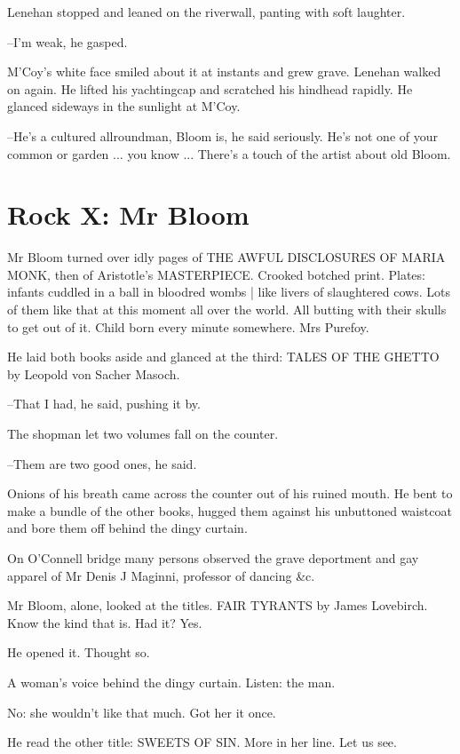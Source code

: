 Lenehan stopped and leaned on the riverwall,
panting with soft
laughter.

--I'm weak,
he gasped.

M'Coy's white face smiled about it at instants
and grew grave.
Lenehan walked on again.
He lifted his yachtingcap and scratched his
hindhead rapidly.
He glanced sideways in the sunlight at M'Coy.

--He's a cultured allroundman,
Bloom is,
he said seriously.
He's not one
of your common or garden ...
you know ...
There's a touch of the artist
about old Bloom.


\section*{Rock X: Mr Bloom}


Mr Bloom turned over idly pages
of THE AWFUL DISCLOSURES OF MARIA MONK,
then of Aristotle's MASTERPIECE.
Crooked botched print.
Plates:
infants cuddled in a ball in bloodred wombs |
like livers of slaughtered cows.
Lots of them like that at this moment all over the world.
All butting with their skulls to get out of it.
Child born every minute
somewhere.
Mrs Purefoy.%

He laid both books aside and glanced at the third:
TALES OF THE GHETTO
by Leopold von Sacher Masoch.

--That I had, he said, pushing it by.

The shopman let two volumes fall on the counter.

--Them are two good ones,
he said.

Onions of his breath came across the counter
out of his ruined
mouth.
He bent to make a bundle of the other books,
hugged them against
his unbuttoned waistcoat
and bore them off behind the dingy curtain.

On O'Connell bridge
many persons observed the grave deportment
and gay apparel of Mr Denis J Maginni,
professor of dancing \&c.

Mr Bloom, alone,
looked at the titles.
FAIR TYRANTS by James Lovebirch.
Know the kind that is.
Had it?
Yes.

He opened it.
Thought so.

A woman's voice behind the dingy curtain.
Listen: the man.

No:
she wouldn't like that much.
Got her it once.

He read the other title:
SWEETS OF SIN.
More in her line.
Let us see.

